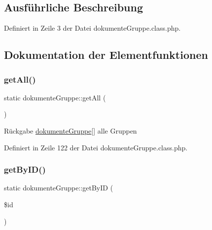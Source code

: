 \subsection{Ausführliche Beschreibung}


Definiert in Zeile 3 der Datei dokumente\+Gruppe.\+class.\+php.



\subsection{Dokumentation der Elementfunktionen}
\mbox{\label{classdokumente_gruppe_a6f9298fcd1326982edfee748482e823a}} 
\subsubsection{\texorpdfstring{get\+All()}{getAll()}}
{\footnotesize\ttfamily static dokumente\+Gruppe\+::get\+All (\begin{DoxyParamCaption}{ }\end{DoxyParamCaption})\hspace{0.3cm}{\ttfamily [static]}}

\begin{DoxyReturn}{Rückgabe}
\mbox{\hyperlink{classdokumente_gruppe}{dokumente\+Gruppe}}\mbox{[}\mbox{]} alle Gruppen 
\end{DoxyReturn}


Definiert in Zeile 122 der Datei dokumente\+Gruppe.\+class.\+php.

\mbox{\label{classdokumente_gruppe_a570b936b4f9267c5d0ad87334ecef3eb}} 
\subsubsection{\texorpdfstring{get\+By\+I\+D()}{getByID()}}
{\footnotesize\ttfamily static dokumente\+Gruppe\+::get\+By\+ID (\begin{DoxyParamCaption}\item[{}]{\$id }\end{DoxyParamCaption})\hspace{0.3cm}{\ttfamily [static]}}


